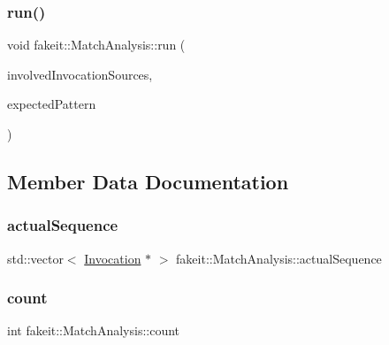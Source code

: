 \mbox{\label{structfakeit_1_1MatchAnalysis_a6c064d01a4c375d30898208326ee3189}} 
\subsubsection{\texorpdfstring{run()}{run()}\hspace{0.1cm}{\footnotesize\ttfamily [9/9]}}
{\footnotesize\ttfamily void fakeit\+::\+Match\+Analysis\+::run (\begin{DoxyParamCaption}\item[{\mbox{\hyperlink{structfakeit_1_1InvocationsSourceProxy}{Invocations\+Source\+Proxy}} \&}]{involved\+Invocation\+Sources,  }\item[{std\+::vector$<$ \mbox{\hyperlink{classfakeit_1_1Sequence}{Sequence}} $\ast$ $>$ \&}]{expected\+Pattern }\end{DoxyParamCaption})\hspace{0.3cm}{\ttfamily [inline]}}



\subsection{Member Data Documentation}
\mbox{\label{structfakeit_1_1MatchAnalysis_ad85230101b9aa52f9b1d56634afd984e}} 
\subsubsection{\texorpdfstring{actualSequence}{actualSequence}}
{\footnotesize\ttfamily std\+::vector$<$ \mbox{\hyperlink{structfakeit_1_1Invocation}{Invocation}} $\ast$ $>$ fakeit\+::\+Match\+Analysis\+::actual\+Sequence}

\mbox{\label{structfakeit_1_1MatchAnalysis_af7cd6b08f370e7746d29b39b31fb7e12}} 
\subsubsection{\texorpdfstring{count}{count}}
{\footnotesize\ttfamily int fakeit\+::\+Match\+Analysis\+::count}

